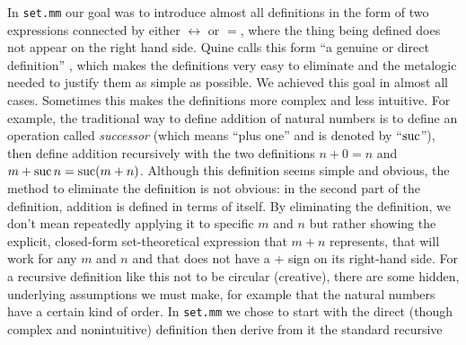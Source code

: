 In \texttt{set.mm} our goal was to introduce almost all definitions in
the form of two expressions connected by either $\leftrightarrow$ or
$=$, where the thing being defined does not appear on the right hand
side.  Quine calls this form ``a genuine or direct definition'' \cite[p.
174]{Quine}, which makes the definitions
very easy to eliminate and the metalogic needed to
justify them as simple as possible.  We achieved this goal in almost all
cases.  Sometimes this makes the definitions more complex and less
intuitive.  For example, the traditional way to define addition of
natural numbers is to define an operation called {\em
successor} (which means ``plus one'' and is denoted by
``${\rm suc}$''), then define addition recursively with the two definitions $n + 0 = n$ and $m + {\rm suc}\,n =
{\rm suc} (m + n)$.  Although this definition seems simple and obvious,
the method to eliminate the definition is not obvious:  in the second
part of the definition, addition is defined in terms of itself.  By
eliminating the definition, we don't mean repeatedly applying it to
specific $m$ and $n$ but rather showing the explicit, closed-form
set-theoretical expression that $m + n$ represents, that will work for
any $m$ and $n$ and that does not have a $+$ sign on its right-hand
side.  For a recursive definition like this not to be circular
(creative), there are some hidden, underlying assumptions we must make,
for example that the natural numbers have a certain kind of order.  In
\texttt{set.mm} we chose to start with the direct (though complex and
nonintuitive) definition then derive from it the standard recursive
